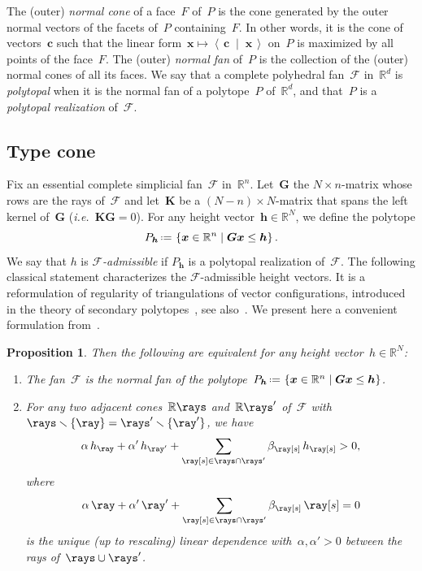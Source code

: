 \documentclass{amsart}
\newtheorem{proposition}[theorem]{Proposition}
\theoremstyle{definition}
\newcommand{\R}{\mathbb{R}} %
\renewcommand{\b}[1]{{\boldsymbol{#1}}} %
\newcommand{\set}[2]{\left\{ #1 \;\middle|\; #2 \right\}} %
\newcommand{\ssm}{\smallsetminus} %
\newcommand{\dotprod}[2]{\left\langle \, #1 \; \middle| \; #2 \, \right\rangle} %
\newcommand{\eqdef}{\mbox{\,\raisebox{0.2ex}{\scriptsize\ensuremath{\mathrm:}}\ensuremath{=}\,}} %
\newcommand{\ie}{\textit{i.e.}~} %
\newcommand{\darkblue}{\color{darkblue}} %
\newcommand{\defn}[1]{\textsl{\darkblue #1}} %
\newcommand{\Fan}{\mathcal{F}} %
\begin{document}
The (outer) \defn{normal cone} of a face~$F$ of~$P$ is the cone generated by the outer normal vectors of the facets of~$P$ containing~$F$.
In other words, it is the cone of vectors~$\b{c}$ such that the linear form~${\b{x} \mapsto \dotprod{\b{c}}{\b{x}}}$ on~$P$ is maximized by all points of the face~$F$.
The (outer) \defn{normal fan} of~$P$ is the collection of the (outer) normal cones of all its faces.
We say that a complete polyhedral fan~$\Fan$ in~$\R^d$ is \defn{polytopal} when it is the normal fan of a polytope~$P$ of~$\R^d$, and that~$P$ is a \defn{polytopal realization} of~$\Fan$.

\subsection{Type cone}

Fix an essential complete simplicial fan~$\Fan$ in~$\R^n$. Let~$\b{G}$ the $N \times n$-matrix whose rows are the rays of~$\Fan$ and let~$\b{K}$ be a $(N-n) \times N$-matrix that spans the left kernel of~$\b{G}$ (\ie $\b{K}\b{G} = 0$). For any height vector~$\b{h} \in \R^N$, we define the polytope
\[
P_\b{h} \eqdef \set{\b{x} \in \R^n}{\b{G}\b{x} \le \b{h}}.
\]
We say that $h$ is \defn{$\Fan$-admissible} if $P_\b{h}$ is a polytopal realization of~$\Fan$.
The following classical statement characterizes the $\Fan$-admissible height vectors.
It is a reformulation of regularity of triangulations of vector configurations, introduced in the theory of secondary polytopes~\cite{GelfandKapranovZelevinsky}, see also~\cite{DeLoeraRambauSantos}.
We present here a convenient formulation from~\cite[Lem.~2.1]{ChapotonFominZelevinsky}.

\begin{proposition}
\label{prop:characterizationPolytopalFan}
Then the following are equivalent for any height vector~$h \in \R^N$:
\begin{enumerate}
\item The fan~$\Fan$ is the normal fan of the polytope~$P_\b{h} \eqdef \set{\b{x} \in \R^n}{\b{G}\b{x} \le \b{h}}$.
\item For any two adjacent cones~$\R \rays$ and~$\R \rays'$ of~$\Fan$ with~$\rays \ssm \{\ray\} = \rays' \ssm \{\ray'\}$, we have
\[
\alpha \, h_{\ray} + \alpha' \, h_{\ray'} + \sum_{\ray[s] \in \rays \cap \rays'} \beta_{\ray[s]} \, h_{\ray[s]} > 0,
\]
where
\[
\alpha \, \ray + \alpha' \, \ray' + \sum_{\ray[s] \in \rays \cap \rays'} \beta_{\ray[s]} \, \ray[s] = 0
\]
is the unique (up to rescaling) linear dependence with~$\alpha, \alpha' > 0$ between the rays of~$\rays \cup \rays'$.
\end{enumerate}
\end{proposition}
\end{document}
